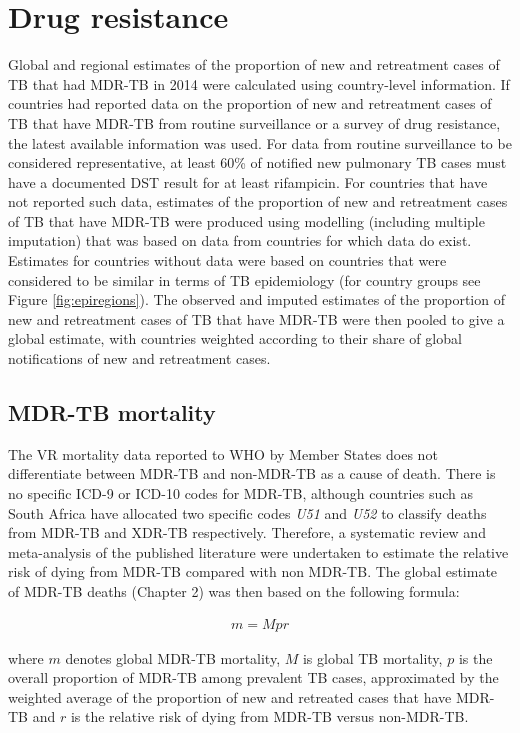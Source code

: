 \section{Drug resistance}

Global and regional estimates of the proportion of new and retreatment cases of TB that had MDR-TB in 2014 were calculated using country-level information. If countries had reported data on the proportion of new and retreatment cases of TB that have MDR-TB from routine surveillance or a survey of drug resistance, the latest available information was used. For data from routine surveillance to be considered representative, at least 60\% of notified new pulmonary TB cases must have a documented DST result for at least rifampicin. For countries that have not reported such data, estimates of the proportion of new and retreatment cases of TB that have MDR-TB were produced using modelling (including multiple imputation) that was based on data from countries for which data do exist. Estimates for countries without data were based on countries that were considered to be similar in terms of TB epidemiology (for country groups see Figure \ref{fig:epiregions}). The observed and imputed estimates of the proportion of new and retreatment cases of TB that have MDR-TB were then pooled to give a global estimate, with countries weighted according to their share of global notifications of new and retreatment cases.

\subsection{MDR-TB mortality}

The VR mortality data reported to WHO by Member States does not differentiate between MDR-TB and non-MDR-TB as a cause of death. There is no specific ICD-9 or ICD-10 codes for MDR-TB, although countries such as South Africa have allocated two specific codes \textit{U51} and \textit{U52} to classify deaths from MDR-TB and XDR-TB respectively. Therefore, a systematic review and meta-analysis of the published literature were undertaken to estimate the relative risk of dying from MDR-TB compared with non MDR-TB. The global estimate of MDR-TB deaths (Chapter 2) was then based on the following formula: 

\begin{align*}
m = Mpr
\end{align*}

where $m$ denotes global MDR-TB mortality, $M$ is global TB mortality, $p$ is the overall proportion of MDR-TB among prevalent TB cases, approximated by the weighted average of the proportion of new and retreated cases that have MDR-TB and $r$ is the relative risk of dying from MDR-TB versus non-MDR-TB.

